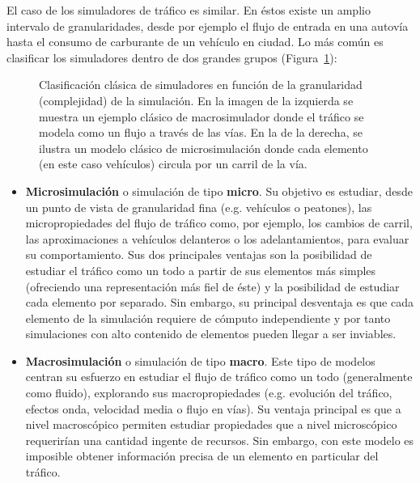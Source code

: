 El caso de los simuladores de tráfico es similar. En éstos existe un amplio intervalo de granularidades, desde por ejemplo el flujo de entrada en una autovía hasta el consumo de carburante de un vehículo en ciudad. Lo más común es clasificar los simuladores dentro de dos grandes grupos (Figura~\ref{fig:granularities-in-traffic-simulation}):

\begin{figure}
	\centering
	\qquad
	\caption[Clasificación de simuladores según granularidad]{Clasificación clásica de simuladores en función de la granularidad (complejidad) de la simulación. En la imagen de la izquierda se muestra un ejemplo clásico de macrosimulador donde el tráfico se modela como un flujo a través de las vías. En la de la derecha, se ilustra un modelo clásico de microsimulación donde cada elemento (en este caso vehículos) circula por un carril de la vía.}
	\label{fig:granularities-in-traffic-simulation}
\end{figure}

\begin{itemize}
	\item \textbf{Microsimulación} o simulación de tipo \textbf{micro}. Su objetivo es estudiar, desde un punto de vista de granularidad fina (e.g. vehículos o peatones), las micropropiedades del flujo de tráfico como, por ejemplo, los cambios de carril, las aproximaciones a vehículos delanteros o los adelantamientos, para evaluar su comportamiento. Sus dos principales ventajas son la posibilidad de estudiar el tráfico como un todo a partir de sus elementos más simples (ofreciendo una representación más fiel de éste) y la posibilidad de estudiar cada elemento por separado. Sin embargo, su principal desventaja es que cada elemento de la simulación requiere de cómputo independiente y por tanto simulaciones con alto contenido de elementos pueden llegar a ser inviables.
	\item \textbf{Macrosimulación} o simulación de tipo \textbf{macro}. Este tipo de modelos centran su esfuerzo en estudiar el flujo de tráfico como un todo (generalmente como fluido), explorando sus macropropiedades (e.g. evolución del tráfico, efectos onda, velocidad media o flujo en vías). Su ventaja principal es que a nivel macroscópico permiten estudiar propiedades que a nivel microscópico requerirían una cantidad ingente de recursos. Sin embargo, con este modelo es imposible obtener información precisa de un elemento en particular del tráfico.
\end{itemize}

